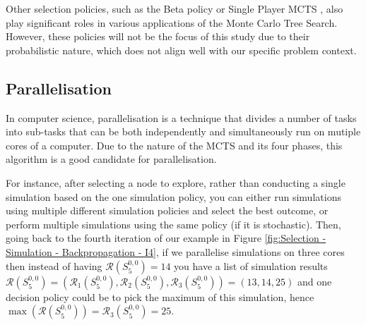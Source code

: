 Other selection policies, such as the Beta policy or Single Player MCTS \cite{different_selection_policies}, also play significant roles in various applications of the Monte Carlo Tree Search. However, these policies will not be the focus of this study due to their probabilistic nature, which does not align well with our specific problem context.
\newpage
\subsection{Parallelisation}
\label{sub:parralelisation}
In computer science, parallelisation is a technique that divides a number of tasks into sub-tasks that can be both independently and simultaneously run on mutiple cores of a computer.
Due to the nature of the MCTS and its four phases, this algorithm is a good candidate for parallelisation.

For instance, after selecting a node to explore, rather than conducting a single simulation based on the one simulation policy, you can either run simulations using multiple different simulation policies and select the best outcome, or perform multiple simulations using the same policy (if it is stochastic).
Then, going back to the fourth iteration of our example in Figure \ref{fig:Selection - Simulation - Backpropagation - I4}, if we parallelise simulations on three cores then instead of having $\mathcal{R}(S^{0,0}_{5})=14$ you have a list of simulation results $\mathcal{R}(S^{0,0}_{5})=(\mathcal{R}_1(S^{0,0}_{5}),\mathcal{R}_2(S^{0,0}_{5}),\mathcal{R}_3(S^{0,0}_{5}))=(13,14,25)$ and one decision policy could be to pick the maximum of this simulation, hence $\max(\mathcal{R}(S^{0,0}_{5}))=\mathcal{R}_3(S^{0,0}_{5})=25$.

